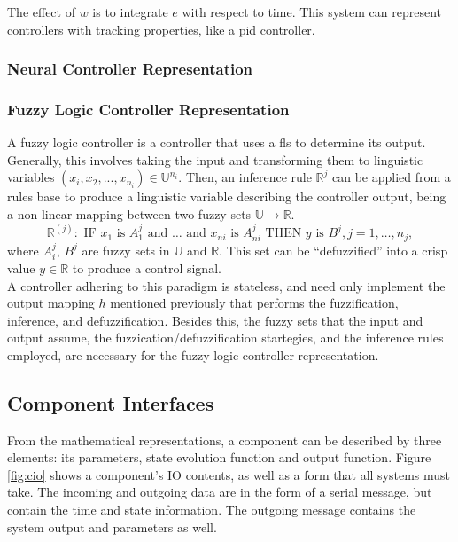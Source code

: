The effect of $w$ is to integrate $e$ with respect to time. This system can represent controllers with tracking
properties, like a \acrshort{pid} controller.

\subsubsection{Neural Controller Representation}


\subsubsection{Fuzzy Logic Controller Representation}

A fuzzy logic controller is a controller that uses a \acrlong{fls} to determine its output. Generally, this involves 
taking the input and transforming them to linguistic variables $(x_i, x_2, ..., x_{n_i}) \in \mathbb U^{n_i}$. Then, 
an inference rule $\mathbb R^j$ can be applied from a rules base to produce a linguistic variable describing 
the controller output, being a non-linear mapping between two fuzzy sets $\mathbb U \rightarrow \mathbb R$. 
\begin{equation}
\mathbb{R}^{(j)}:\text{ IF }x_{1}\text{ is }A_{1}^{j}\text{ and }\ldots\text{ and }x_{n i}\text{ is }A_{n i}^{j}\text{ THEN }y\text{ is }B^{j}, j=1, \ldots, n_{j},
\end{equation}
where $A_i^j$, $B^j$ are fuzzy sets in $\mathbb U$ and $\mathbb R$. This set can be ``defuzzified'' into a crisp value $y \in \mathbb R$ to produce a control signal. \\

A controller adhering to this paradigm is stateless, and need only implement the output mapping $h$
mentioned previously that performs the fuzzification, inference, and defuzzification. Besides this, the fuzzy 
sets that the input and output assume, the fuzzication/defuzzification startegies, and the inference rules employed, are necessary for the fuzzy logic controller representation.

\subsection{Component Interfaces}

From the mathematical representations, a component can be described by three elements: its parameters, 
state evolution function and output function. Figure \ref{fig:cio} shows a component's IO contents, as well as 
a form that all systems must take. The incoming and outgoing data are in the form of a serial message, but 
contain the time and state information. The outgoing message contains the system output and parameters as 
well.

